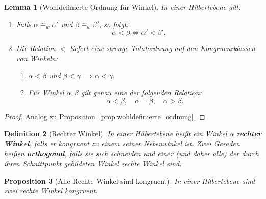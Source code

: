 \documentclass[a4paper,12pt]{article}
\theoremstyle{break}
\newtheorem{definition}{Definition}[section]
\newtheorem{proposition}[definition]{Proposition}
\newtheorem{lemma}[definition]{Lemma}
\begin{document}
\begin{lemma}[Wohldefinierte Ordnung für Winkel]\label{lemma:wohldefiniert_ordnung_winkel}
In einer Hilbertebene gilt:
\begin{enumerate}
    \item Falls \(\alpha \cong_w \alpha'\) und \(\beta \cong_w \beta'\), so folgt:
    \[
    \alpha < \beta \iff \alpha' < \beta'.
    \]
    \item Die Relation \(<\) liefert eine strenge Totalordnung auf den Kongruenzklassen von Winkeln:
    \begin{enumerate}
        \item[\((2.1)\)] \(\alpha < \beta\) und \(\beta < \gamma \implies \alpha < \gamma.\)
        \item[\((2.2)\)] Für Winkel \(\alpha, \beta\) gilt genau eine der folgenden Relation:
        \[
        \alpha < \beta, \quad \alpha = \beta, \quad \alpha > \beta.
        \]
    \end{enumerate}
\end{enumerate}
\end{lemma}

\begin{proof}
Analog zu Proposition~\ref{prop:wohldefinierte_ordnung}.
\end{proof}

\begin{definition}[Rechter Winkel]
In einer Hilbertebene heißt ein Winkel \(\alpha\) \textbf{rechter Winkel}, falls er kongruent zu einem seiner Nebenwinkel ist.
Zwei Geraden heißen \textbf{orthogonal}, falls sie sich schneiden und einer (und daher alle) der durch ihren Schnittpunkt gebildeten Winkel rechte Winkel sind.
\end{definition}

\begin{proposition}[Alle Rechte Winkel sind kongruent]
In einer Hilbertebene sind zwei rechte Winkel kongruent.
\end{proposition}
\end{document}
